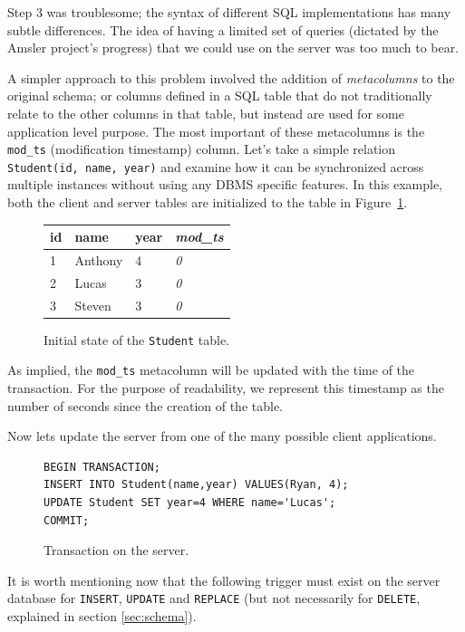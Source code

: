 \documentclass[journal]{IEEEtran}
\begin{document}
Step 3 was troublesome; the syntax of different SQL implementations has many subtle differences. The idea of having a limited set of queries (dictated by the Amsler project's progress) that we could use on the server was too much to bear.

A simpler approach to this problem involved the addition of \textit{metacolumns} to the original schema; or columns defined in a SQL table that do not traditionally relate to the other columns in that table, but instead are used for some application level purpose. The most important of these metacolumns is the \texttt{mod\_ts} (modification timestamp) column. Let's take a simple relation \hbox{\texttt{Student(id, name, year)}} and examine how it can be synchronized across multiple instances without using any DBMS specific features. In this example, both the client and server tables are initialized to the table in Figure~\ref{fig:student_init}. 


\begin{figure}[h!]
\center
\begin{tabular}{ l | l | l || l }
id  & name      & year  & \textit{mod\_ts} \\
\hline  \hline
1   & Anthony   & 4     & \textit{0}        \\
2   & Lucas     & 3     & \textit{0}        \\
3   & Steven    & 3     & \textit{0}        \\
\end{tabular}
\caption{Initial state of the \texttt{Student} table.}
\label{fig:student_init}
\end{figure}

As implied, the \texttt{mod\_ts} metacolumn will be updated with the time of the transaction. For the purpose of readability, we represent this timestamp as the number of seconds since the creation of the table. 

Now lets update the server from one of the many possible client applications. 


\begin{figure}[h!]
\begin{lstlisting}
BEGIN TRANSACTION;
INSERT INTO Student(name,year) VALUES(Ryan, 4);
UPDATE Student SET year=4 WHERE name='Lucas';
COMMIT;
\end{lstlisting}
\caption{Transaction on the server.}
\label{fig:student_transaction1}
\end{figure}

It is worth mentioning now that the following trigger must exist on the server database for \texttt{INSERT}, \texttt{UPDATE} and \texttt{REPLACE} (but not necessarily for \texttt{DELETE}, explained in section \ref{sec:schema}).
\end{document}
